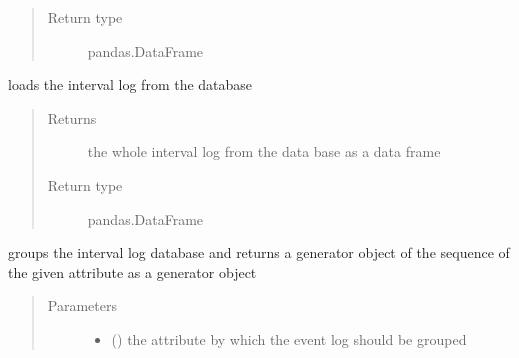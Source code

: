 \documentclass[letterpaper,10pt,english]{sphinxmanual}
\begin{document}
\begin{fulllineitems}
\begin{fulllineitems}
\begin{quote}
\begin{description}
\item[{Return type}] \leavevmode
\sphinxAtStartPar
pandas.DataFrame

\end{description}\end{quote}

\end{fulllineitems}


\begin{fulllineitems}
\label{\detokenize{event_log_analyzer:event_log_analyzer.event_log.EventLogStorage.get_interval_log}}
\sphinxAtStartPar
loads the interval log from the database
\begin{quote}\begin{description}
\item[{Returns}] \leavevmode
\sphinxAtStartPar
{} \textendash{} the whole interval log from the data base as a data frame

\item[{Return type}] \leavevmode
\sphinxAtStartPar
pandas.DataFrame

\end{description}\end{quote}

\end{fulllineitems}


\begin{fulllineitems}
\label{\detokenize{event_log_analyzer:event_log_analyzer.event_log.EventLogStorage.get_interval_sequence}}
\sphinxAtStartPar
groups the interval log database and returns a generator object of the sequence of the given attribute as a generator object
\begin{quote}\begin{description}
\item[{Parameters}] \leavevmode\begin{itemize}
\item {} 
\sphinxAtStartPar
{} () \textendash{} the attribute by which the event log should be grouped


\end{itemize}
\end{description}
\end{quote}
\end{fulllineitems}
\end{fulllineitems}
\end{document}
